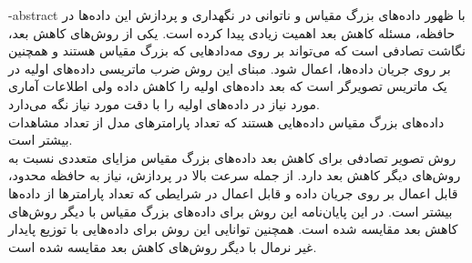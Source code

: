 
\fa-abstract{
با ظهور داده‌های بزرگ مقیاس و ناتوانی در نگهداری و پردازش این داده‌ها در حافظه، مسئله کاهش بعد اهمیت زیادی پیدا کرده است. یکی از روش‌های کاهش بعد، نگاشت تصادفی است که می‌تواند بر روی مه‌داد‌هایی که بزرگ مقیاس هستند و همچنین بر روی جریان‌ داده‌ها، اعمال شود. مبنای این روش ضرب ماتریسی داده‌های اولیه در یک ماتریس تصویرگر است که بعد داده‌های اولیه را کاهش داده ولی اطلاعات آماری مورد نیاز در داده‌های اولیه را با دقت مورد نیاز نگه می‌دارد.\\
داده‌های بزرگ مقیاس داده‌هایی هستند که تعداد پارامترهای مدل از تعداد مشاهدات بیشتر است.\\
روش تصویر تصادفی برای کاهش بعد داده‌های بزرگ مقیاس مزایای متعددی نسبت به روش‌های دیگر کاهش بعد دارد. از جمله سرعت بالا در پردازش، نیاز به حافظه محدود، قابل اعمال بر روی جریان داده و قابل اعمال در شرایطی که تعداد پارامتر‌ها از داده‌ها بیشتر است. در این پایان‌نامه این روش برای داده‌های بزرگ مقیاس با دیگر روش‌های کاهش بعد مقایسه شده است. همچنین توانایی این روش برای داده‌هایی با توزیع پایدار غیر نرمال با دیگر روش‌های کاهش بعد مقایسه شده است.
}





\AUTtitle
